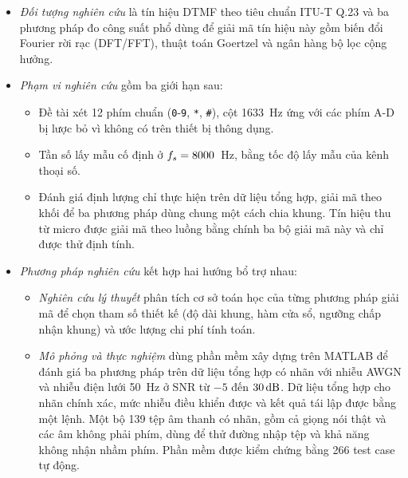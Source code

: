 \documentclass{dtmf_report}
\begin{document}
\begin{itemize}
  \item \emph{Đối tượng nghiên cứu} là tín hiệu DTMF theo tiêu chuẩn \mbox{ITU-T} Q.23
        và ba phương pháp đo công suất phổ dùng để giải mã tín hiệu
        này gồm biến đổi Fourier rời rạc (DFT/FFT), thuật toán Goertzel và ngân
        hàng bộ lọc cộng hưởng.
  \item \emph{Phạm vi nghiên cứu} gồm ba giới hạn sau:
        \begin{itemize}[label=+]
          \item Đề tài xét 12 phím chuẩn (\texttt{0}-\texttt{9}, \texttt{*},
                \texttt{\#}), cột 1633~Hz ứng
                với các phím A-D bị lược bỏ vì không có trên thiết bị thông
                dụng.
          \item Tần số lấy mẫu cố định ở $f_{s} = 8000$~Hz, bằng tốc độ lấy mẫu của
                kênh thoại số.
          \item Đánh giá định lượng chỉ thực hiện trên dữ liệu tổng hợp, giải
                mã theo khối để ba phương pháp dùng chung một cách chia khung.
                Tín hiệu thu từ micro được giải mã theo luồng bằng chính ba bộ
                giải mã này và chỉ được thử định tính.
        \end{itemize}
  \item \emph{Phương pháp nghiên cứu} kết hợp hai hướng bổ trợ nhau:
        \begin{itemize}
          \item \emph{Nghiên cứu lý thuyết} phân tích cơ sở toán học của từng
                phương pháp giải mã để chọn tham số thiết kế (độ dài khung, hàm
                cửa sổ, ngưỡng chấp nhận khung) và ước lượng chi phí tính toán.
          \item \emph{Mô phỏng và thực nghiệm} dùng phần mềm xây dựng trên MATLAB
                để đánh giá ba phương pháp trên dữ liệu tổng hợp có nhãn với
                nhiễu AWGN và nhiễu điện lưới 50~Hz ở SNR từ $-5$ đến $30\,\mathrm{dB}$. Dữ liệu
                tổng hợp cho nhãn chính xác, mức nhiễu điều khiển được và kết quả
                tái lập được bằng một lệnh. Một bộ 139 tệp âm thanh có nhãn, gồm cả
                giọng nói thật và các âm không phải phím, dùng để thử đường nhập
                tệp và khả năng không nhận nhầm phím. Phần mềm được kiểm chứng bằng
                266 test case tự động.
        \end{itemize}
\end{itemize}
\end{document}
